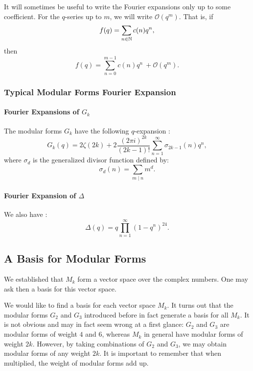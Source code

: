 It will sometimes be useful to write the Fourier expansions only up to some coefficient.
For the $q$-series up to $m$, we will write $\mathcal{O}(q^m)$.
That is, if
$$
f(q) = \sum_{n \in \mathbb{N}} c(n) q^n,
$$
then
$$
f(q) = \sum_{n = 0}^{m-1} c(n) q^n \ + \mathcal{O}(q^m).
$$


\subsubsection{Typical Modular Forms Fourier Expansion}
\paragraph{Fourier Expansions of $G_k$}
The modular forms $G_k$ have the following $q$-expansion \cite[p.92]{CourseInArithmetic}:
$$
G_k(q) = 2\zeta(2k) + 2 \frac{{(2 \pi i)}^{2k}}{(2k-1)!} \sum_{n=1}^{\infty} \sigma_{2k-1}(n)q^n,
$$
where $\sigma_d$ is the generalized divisor function defined by:
$$
\sigma_d(n) = \sum_{m \mid n} m^d.
$$

\paragraph{Fourier Expansion of $\Delta$}
We also have \cite[p.95]{CourseInArithmetic}:
$$
\Delta(q) = q \prod_{n=1}^{\infty} (1-q^n)^{24}.
$$



\subsection{A Basis for Modular Forms}
\label{BasisModularForms}
We established that $M_k$ form a vector space over the complex numbers. 
One may ask then a basis for this vector space.

We would like to find a basis for each vector space $M_k$. It turns out that the modular forms $G_2$ and $G_3$ introduced before in fact generate a basis for all $M_k$. 
It is not obvious and may in fact seem wrong at a first glance: $G_2$ and $G_3$ are modular forms of weight $4$ and $6$, whereas $M_k$ in general have modular forms of weight $2k$.
However, by taking combinations of $G_2$ and $G_3$, we may obtain modular forms of any weight $2k$. It is important to remember that when multiplied, the weight of modular forms add up.

